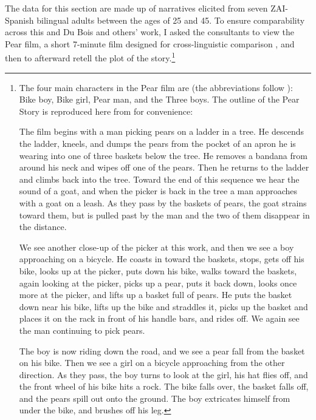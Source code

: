 The data for this section are made up of narratives elicited from seven ZAI-Spanish bilingual adults between the ages of 25 and 45. To ensure comparability across this and Du Bois and others' work, I asked the consultants to view the Pear film, a short 7-minute film designed for cross-linguistic comparison \citep{chafe1980}, and then to afterward retell the plot of the story.\footnote{The four main characters in the Pear film are (the abbreviations follow \citealt{chafe1980}): Bike boy, Bike girl, Pear man, and the Three boys. The outline of the Pear Story is reproduced here from \citet[xiii-xiv]{chafe1980} for convenience:

The film begins with a man picking pears on a ladder in a tree. He descends the ladder, kneels, and dumps the pears from the pocket of an apron he is wearing into one of three baskets below the tree. He removes a bandana from around his neck and wipes off one of the pears. Then he returns to the ladder and climbs back into the tree. Toward the end of this sequence we hear the sound of a goat, and when the picker is back in the tree a man approaches with a goat on a leash. As they pass by the baskets of pears, the goat strains toward them, but is pulled past by the man and the two of them disappear in the distance. 

We see another close-up of the picker at this work, and then we see a boy approaching on a bicycle. He coasts in toward the baskets, stops, gets off his bike, looks up at the picker, puts down his bike, walks toward the baskets, again looking at the picker, picks up a pear, puts it back down, looks once more at the picker, and lifts up a basket full of pears. He puts the basket down near his bike, lifts up the bike and straddles it, picks up the basket and places it on the rack in front of his handle bars, and rides off. We again see the man continuing to pick pears.

The boy is now riding down the road, and we see a pear fall from the basket on his bike. Then we see a girl on a bicycle approaching from the other direction. As they pass, the boy turns to look at the girl, his hat flies off, and the front wheel of his bike hits a rock. The bike falls over, the basket falls off, and the pears spill out onto the ground. The boy extricates himself from under the bike, and brushes off his leg. 

}
